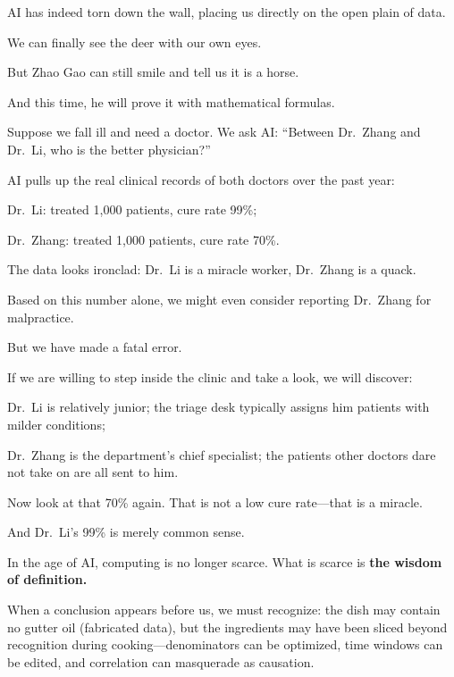 AI has indeed torn down the wall, placing us directly on the open plain of data.

We can finally see the deer with our own eyes.

But Zhao Gao can still smile and tell us it is a horse.

And this time, he will prove it with mathematical formulas.

\vspace{1em}

Suppose we fall ill and need a doctor. We ask AI: ``Between Dr.\ Zhang and Dr.\ Li, who is the better physician?''

AI pulls up the real clinical records of both doctors over the past year:

Dr.\ Li: treated 1,000 patients, cure rate 99\%;

Dr.\ Zhang: treated 1,000 patients, cure rate 70\%.

\vspace{1em}

The data looks ironclad: Dr.\ Li is a miracle worker, Dr.\ Zhang is a quack.

Based on this number alone, we might even consider reporting Dr.\ Zhang for malpractice.

But we have made a fatal error.

\vspace{1em}

If we are willing to step inside the clinic and take a look, we will discover:

Dr.\ Li is relatively junior; the triage desk typically assigns him patients with milder conditions;

Dr.\ Zhang is the department's chief specialist; the patients other doctors dare not take on are all sent to him.

Now look at that 70\% again. That is not a low cure rate---that is a miracle.

And Dr.\ Li's 99\% is merely common sense.

\vspace{1em}

In the age of AI, computing is no longer scarce. What is scarce is \textbf{the wisdom of definition.}

When a conclusion appears before us, we must recognize: the dish may contain no gutter oil (fabricated data), but the ingredients may have been sliced beyond recognition during cooking---denominators can be optimized, time windows can be edited, and correlation can masquerade as causation.

